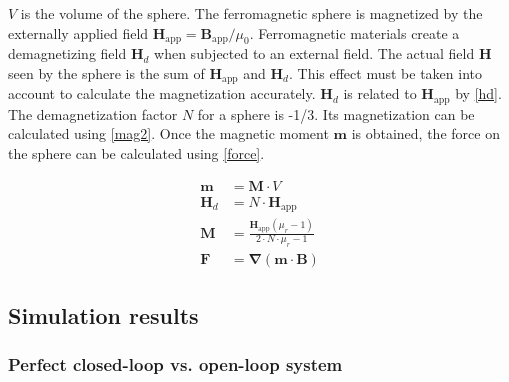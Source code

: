 \documentclass[letterpaper, 10 pt, conference]{ieeeconf}  %
\begin{document}
$V$ is the volume of the sphere.
The ferromagnetic sphere is magnetized by the externally applied field $\mathbf{H}_{\text{app}}=\mathbf{B}_{\text{app}}/\mu_0$. Ferromagnetic materials create a demagnetizing field $\mathbf{H}_d$ when subjected to an external field. The actual field $\mathbf{H}$ seen by the sphere is the sum of $\mathbf{H}_{\text{app}}$ and $\mathbf{H}_d$. This effect must be taken into account to calculate the magnetization accurately. $\mathbf{H}_d$ is related to $\mathbf{H}_{\text{app}}$ by \cref{hd}. The demagnetization factor $N$ for a sphere is -1/3. Its magnetization can be calculated using \cref{mag2}.
Once the magnetic moment $\mathbf{m}$ is obtained, the force on the sphere can be calculated using \cref{force}.
\vspace{-2em}

\begin{align}
\mathbf{m}&=\mathbf{M}\cdot V \label{mag}\\
\mathbf{H}_d&=N\cdot \mathbf{H}_{\text{app}}\label{hd}\\
\mathbf{M}&=\frac{\mathbf{H}_{\text{app}}\left ( \mu_r-1  \right )}{2\cdot N\cdot \mu_r-1} \label{mag2}\\
\mathbf{F}&=\mathbf{\nabla}(\mathbf{m}\cdot \mathbf{B}) \label{force}
\end{align}

\subsection{Simulation results}

\subsubsection{Perfect closed-loop vs. open-loop system}
\label{clol}
\end{document}
